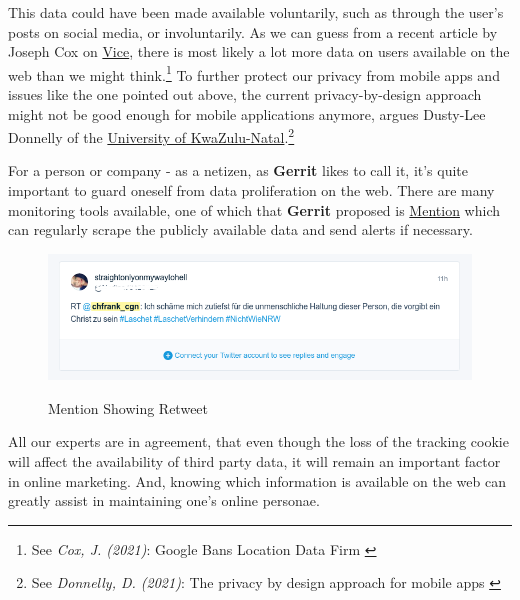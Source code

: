 This data could have been made available voluntarily, such as through the user's posts on social media, or involuntarily. As we can guess from a recent article by Joseph Cox on \href{https://www.vice.com/en}{Vice}, there is most likely a lot more data on users available on the web than we might think.\footnote{See \textit{Cox, J. (2021)}: Google Bans Location Data Firm \cite{locationBan}} To further protect our privacy from mobile apps and issues like the one pointed out above, the current privacy-by-design approach might not be good enough for mobile applications anymore, argues Dusty-Lee Donnelly of the \href{https://ukzn.ac.za/}{University of KwaZulu-Natal}.\footnote{See \textit{Donnelly, D. (2021)}: The privacy by design approach for mobile apps \cite{privacyDesign}}

For a person or company - as a netizen, as \textbf{Gerrit} likes to call it, it's quite important to guard oneself from data proliferation on the web. There are many monitoring tools available, one of which that \textbf{Gerrit} proposed is \href{https://mention.com/en/}{Mention} which can regularly scrape the publicly available data and send alerts if necessary.

\begin{figure}[H]
\centering
\caption {Mention Showing Retweet}
\includegraphics[width=\linewidth]{images/retweet-mention.png}
\label{fig:retweet}
\end{figure}

All our experts are in agreement, that even though the loss of the tracking cookie will affect the availability of third party data, it will remain an important factor in online marketing. And, knowing which information is available on the web can greatly assist in maintaining one's online personae.

